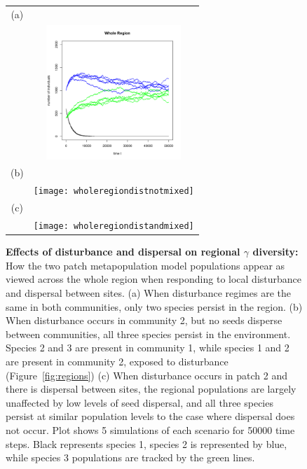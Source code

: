 \begin{figure}[htbp]
\begin{center}
\begin{tabular}{cc}
(a)&\\
&\includegraphics[width=2in]{wholeregionnodist} \\
(b)&\\
&\texttt{[image: wholeregiondistnotmixed]} \\
(c)&\\
&\texttt{[image: wholeregiondistandmixed]} 
\end{tabular}
\caption[Effects of disturbance and dispersal on regional $\gamma$ diversity]{\textbf{Effects of disturbance and dispersal on regional $\gamma$ diversity:} How the two patch metapopulation model populations appear as viewed across the whole region when responding to local disturbance and dispersal between sites. (a) When disturbance regimes are the same in both communities, only two species persist in the region. (b) When disturbance occurs in community 2, but no seeds disperse between communities, all three species persist in the environment. Species 2 and 3 are present in community 1, while species 1 and 2 are present in community 2, exposed to disturbance (Figure~\ref{fig:regions}) (c) When disturbance occurs in patch 2 and there is dispersal between sites, the regional populations are largely unaffected by low levels of seed dispersal, and all three species persist at similar population levels to the case where dispersal does not occur. Plot shows 5 simulations of each scenario for 50000 time steps. Black represents species 1, species 2 is represented by blue, while species 3 populations are tracked by the green lines.}
\label{wholereg}
\end{center}
\end{figure}


